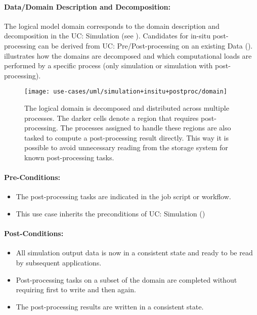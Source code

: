 \paragraph{Data/Domain Description and Decomposition:}
The logical model domain corresponds to the domain description and decomposition in the UC: Simulation (see ).
Candidates for in-situ post-processing can be derived from UC: Pre/Post-processing on an existing Data ().
 illustrates how the domains are decomposed and which computational loads are performed by a specific process (only simulation or simulation with post-processing).



\begin{figure}
	\centering
	\texttt{[image: use-cases/uml/simulation+insitu+postproc/domain]}
	\caption{The logical domain is decomposed and distributed across multiple processes. The darker cells denote a region that requires post-processing. The processes assigned to handle these regions are also tasked to compute a post-processing result directly. This way it is possible to avoid unnecessary reading from the storage system for known post-processing tasks.}
	\label{fig:domain simulation+insitu+postproc}
\end{figure}




\paragraph{Pre-Conditions:}
\begin{itemize}
	\item The post-processing tasks are indicated in the job script or workflow.
	\item This use case inherits the preconditions of UC: Simulation ()
\end{itemize}


\paragraph{Post-Conditions:}
\begin{itemize}
	\item All simulation output data is now in a consistent state and ready to be read by subsequent applications.
	\item Post-processing tasks on a subset of the domain are completed without requiring first to write and then again.
	\item The post-processing results are written in a consistent state.
\end{itemize}



